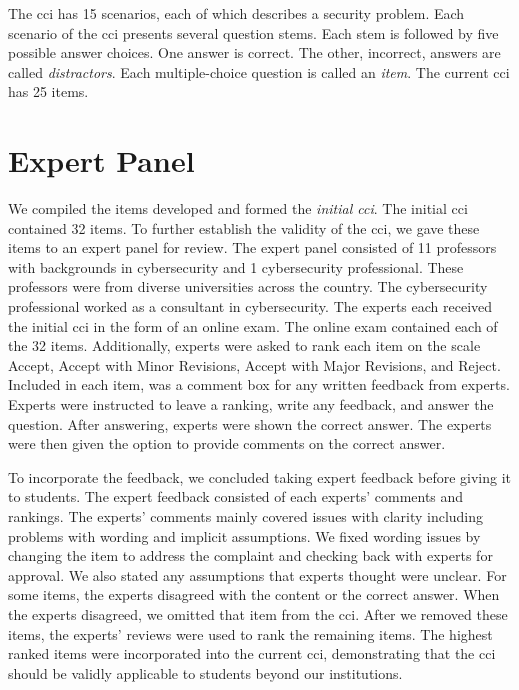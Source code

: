 The \gls{cci} has 15 scenarios, each of which describes a security problem. Each scenario of the \gls{cci} presents several question stems. Each stem is followed by five possible answer choices. One answer is correct. The other, incorrect, answers are called \textit{distractors}. Each multiple-choice question is called an \textit{item}. The current \gls{cci} has 25 items.



\section{Expert Panel}

We compiled the items developed and formed the \textit{initial \gls{cci}}.  The initial \gls{cci} contained 32 items. To further establish the validity of the \gls{cci}, we gave these items to an expert panel for review. The expert panel consisted of 11 professors with backgrounds in cybersecurity and 1 cybersecurity professional. These professors were from diverse universities across the country. The cybersecurity professional worked as a consultant in cybersecurity. The experts each received the initial \gls{cci} in the form of an online exam. The online exam contained each of the 32 items. Additionally, experts were asked to rank each item on the scale Accept, Accept with Minor Revisions, Accept with Major Revisions, and Reject. Included in each item, was a comment box for any written feedback from experts. Experts were instructed to leave a ranking, write any feedback, and answer the question. After answering, experts were shown the correct answer. The experts were then given the option to provide comments on the correct answer. 


To incorporate the feedback, we concluded taking expert feedback before giving it to students. The expert feedback consisted of each experts' comments and rankings. The experts' comments mainly covered issues with clarity including problems with wording and implicit assumptions. We fixed wording issues by changing the item to address the complaint and checking back with experts for approval. We also stated any assumptions that experts thought were unclear. For some items, the experts disagreed with the content or the correct answer. When the experts disagreed, we omitted that item from the \gls{cci}. After we removed these items, the experts' reviews were used to rank the remaining items. The highest ranked items were incorporated into the current \gls{cci}, demonstrating that the \gls{cci} should be validly applicable to students beyond our institutions.

